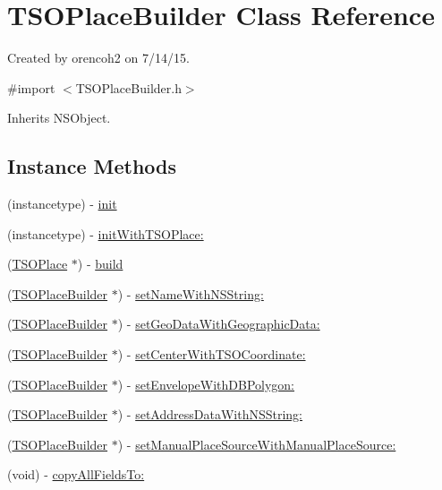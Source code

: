 \hypertarget{interface_t_s_o_place_builder}{}\section{T\+S\+O\+Place\+Builder Class Reference}
\label{interface_t_s_o_place_builder}


Created by orencoh2 on 7/14/15.  




{\ttfamily \#import $<$T\+S\+O\+Place\+Builder.\+h$>$}



Inherits N\+S\+Object.

\subsection*{Instance Methods}
\begin{DoxyCompactItemize}
\item 
(instancetype) -\/ \hyperlink{interface_t_s_o_place_builder_a294b7483c495515382feff2ad0f991a7}{init}
\item 
(instancetype) -\/ \hyperlink{interface_t_s_o_place_builder_ad890b4a1af79e11b29df29a033015785}{init\+With\+T\+S\+O\+Place\+:}
\item 
(\hyperlink{interface_t_s_o_place}{T\+S\+O\+Place} $\ast$) -\/ \hyperlink{interface_t_s_o_place_builder_a48c45e627b73e8949c4a35539e18f5f3}{build}
\item 
(\hyperlink{interface_t_s_o_place_builder}{T\+S\+O\+Place\+Builder} $\ast$) -\/ \hyperlink{interface_t_s_o_place_builder_a9b668883d3506fb18a75692697c4f694}{set\+Name\+With\+N\+S\+String\+:}
\item 
(\hyperlink{interface_t_s_o_place_builder}{T\+S\+O\+Place\+Builder} $\ast$) -\/ \hyperlink{interface_t_s_o_place_builder_a43b95eb4753996b54b4aa305676da1a8}{set\+Geo\+Data\+With\+Geographic\+Data\+:}
\item 
(\hyperlink{interface_t_s_o_place_builder}{T\+S\+O\+Place\+Builder} $\ast$) -\/ \hyperlink{interface_t_s_o_place_builder_a90fd8a69f98f35a82fdbdb156cc328a0}{set\+Center\+With\+T\+S\+O\+Coordinate\+:}
\item 
(\hyperlink{interface_t_s_o_place_builder}{T\+S\+O\+Place\+Builder} $\ast$) -\/ \hyperlink{interface_t_s_o_place_builder_ace1e1fa4597e5a14b71ee6217b7abea4}{set\+Envelope\+With\+D\+B\+Polygon\+:}
\item 
(\hyperlink{interface_t_s_o_place_builder}{T\+S\+O\+Place\+Builder} $\ast$) -\/ \hyperlink{interface_t_s_o_place_builder_adafc5a46cc3db3d444bc87e8fd54906d}{set\+Address\+Data\+With\+N\+S\+String\+:}
\item 
(\hyperlink{interface_t_s_o_place_builder}{T\+S\+O\+Place\+Builder} $\ast$) -\/ \hyperlink{interface_t_s_o_place_builder_a6222749b469ad1182f92c4e5defa7b12}{set\+Manual\+Place\+Source\+With\+Manual\+Place\+Source\+:}
\item 
(void) -\/ \hyperlink{interface_t_s_o_place_builder_af28465fb7f04906f5fd3f55657e12b98}{copy\+All\+Fields\+To\+:}
\end{DoxyCompactItemize}
